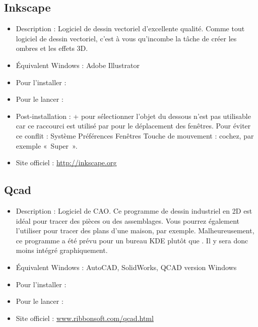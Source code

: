 \subsection{Inkscape}
\begin{itemize}
\begingroup
{}
\item Description : Logiciel de dessin vectoriel d'excellente qualité. Comme tout logiciel de dessin vectoriel, c'est à vous qu'incombe la tâche de créer les ombres et les effets 3D.{\par}
\item Équivalent Windows : Adobe Illustrator{\par}
\endgroup
\item Pour l'installer : 
\item Pour le lancer : 
\item Post-installation :  +  pour sélectionner l'objet du dessous n'est pas utilisable car ce raccourci est utilisé par  pour le déplacement des fenêtres. Pour éviter ce conflit : Système \FlecheDroite Préférences \FlecheDroite Fenêtres \FlecheDroite Touche de mouvement : cochez, par exemple «~Super~».{\par}
\item Site officiel : \url{http://inkscape.org}{\par}
\end{itemize}
\subsection{Qcad}
\begin{itemize}
\begingroup
{}
\item Description : Logiciel de CAO. Ce programme de dessin industriel en 2D est idéal pour tracer des pièces ou des assemblages. Vous pourrez également l'utiliser pour tracer des plans d'une maison, par exemple. Malheureusement, ce programme a été prévu pour un bureau KDE plutôt que . Il y sera donc moins intégré graphiquement.{\par}
\endgroup
\item Équivalent Windows : AutoCAD, SolidWorks, QCAD version Windows
\item Pour l'installer : 
\item Pour le lancer : 
\item Site officiel : \url{www.ribbonsoft.com/qcad.html}{\par}
\end{itemize}

